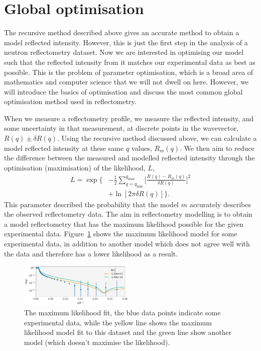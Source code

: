\documentclass[
 reprint,
 superscriptaddress,
 amsmath,amssymb,
 aps,
]{revtex4-1}
\begin{document}
\section{Global optimisation}
The recursive method described above gives an accurate method to obtain a model reflected intensity.
However, this is just the first step in the analysis of a neutron reflectometry dataset.
Now we are interested in optimising our model such that the reflected intensity from it matches our experimental data as best as possible.
This is the problem of parameter optimisation, which is a broad area of mathematics and computer science that we will not dwell on here.
However, we will introduce the basics of optimisation and discuss the most common global optimisation method used in reflectometry.

When we measure a reflectometry profile, we measure the reflected intensity, and some uncertainty in that measurement, at discrete points in the wavevector, $R(q) \pm \delta R(q)$.
Using the recursive method discussed above, we can calculate a model reflected intensity at these same $q$ values, $R_m(q)$.
We then aim to reduce the difference between the measured and modelled reflected intensity through the optimisation (maximisation) of the likelihood, $L$,
%
\begin{equation}
    \begin{aligned}
        L = \exp\bigg\{ & - \frac{1}{2} \sum_{q=q_{\text{min}}}^{q_{\text{max}}} \bigg[\frac{R(q) - R_m(q)}{\delta R(q)}\bigg]^2 \\
         & + \ln[2\pi \delta R(q)]\bigg\}.
    \end{aligned}
\end{equation}
%
This parameter described the probability that the model $m$ accurately describes the observed reflectometry data.
The aim in reflectometry modelling is to obtain a model reflectometry that has the maximum likelihood possible for the given experimental data.
Figure~\ref{fig:likelihood} shows the maximum likelihood model for some experimental data, in addition to another model which does not agree well with the data and therefore has a lower likelihood as a result.
%
\begin{figure}[t]
    \includegraphics[width=0.49\textwidth]{likelihood}
    \caption{The maximum likelihood fit, the blue data points indicate some experimental data, while the yellow line shows the maximum likelihood model fit to this dataset and the green line show another model (which doesn't maximise the likelihood).}
    \label{fig:likelihood}
\end{figure}
%
\end{document}

